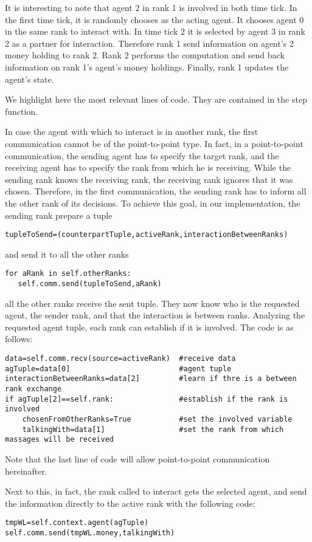\documentclass{article}
\begin{document}
It is interesting to note that agent 2 in rank 1 is involved in both time tick.
In the first time tick, it is randomly chooses as the acting agent. It chooses agent 0 in the same rank to interact with.
In time tick 2 it is selected by agent 3 in rank 2 as a partner for interaction. Therefore rank 1 send information on agent's 2 money holding to rank 2.
Rank 2 performs the computation and send back information on rank 1's agent's money holdings. Finally, rank 1 updates the agent's state.

We highlight here the most relevant lines of code. They are contained in the step function.  

In case the agent with which to interact is in another rank, the first communication cannot be of the point-to-point type. In fact, in a point-to-point communication, the sending agent has to specify the target rank, and the receiving agent has to specify the rank from which he is receiving. While the sending rank knows the receiving rank, the receiving rank ignores that it was chosen. Therefore, in the first communication, the sending rank has to inform all the other rank of its decisions. To achieve this goal, in our implementation, the sending rank prepare a tuple 
\begin{verbatim}
tupleToSend=(counterpartTuple,activeRank,interactionBetweenRanks)
\end{verbatim}
and send it to all the other ranks
\begin{verbatim}
for aRank in self.otherRanks:
   self.comm.send(tupleToSend,aRank)
\end{verbatim}
all the other ranks receive the sent tuple. They now know who is the requested agent, the sender rank, and that the interaction is between ranks.
Analyzing the requested agent tuple, each rank can establish if it is involved. The code is as follows:
\begin{verbatim}
data=self.comm.recv(source=activeRank)  #receive data
agTuple=data[0]                         #agent tuple
interactionBetweenRanks=data[2]         #learn if thre is a between rank exchange
if agTuple[2]==self.rank:               #establish if the rank is involved
    chosenFromOtherRanks=True           #set the involved variable
    talkingWith=data[1]                 #set the rank from which massages will be received
\end{verbatim}
Note that the last line of code will allow point-to-point communication hereinafter.

Next to this, in fact, the rank called to interact gets the selected agent, and send the information directly to the active rank with the following code:
\begin{verbatim}
tmpWL=self.context.agent(agTuple)
self.comm.send(tmpWL.money,talkingWith)
\end{verbatim}             
\end{document}
